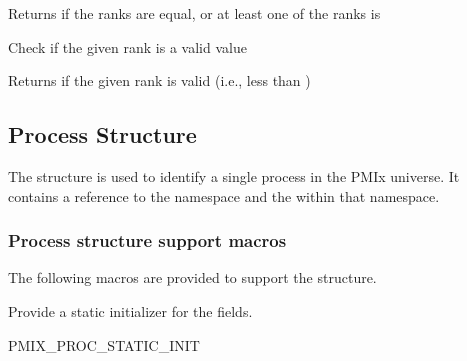 Returns  if the ranks are equal, or at least one of the ranks is 


Check if the given rank is a valid value


\begin{arglist}
\end{arglist}

Returns  if the given rank is valid (i.e., less than )

\subsection{Process Structure}

The  structure is used to identify a single process in the PMIx universe.
It contains a reference to the namespace and the  within that namespace.


\subsubsection{Process structure support macros}
The following macros are provided to support the  structure.


Provide a static initializer for the  fields.

\cspecificstart
\begin{codepar}
PMIX_PROC_STATIC_INIT
\end{codepar}
\cspecificend

